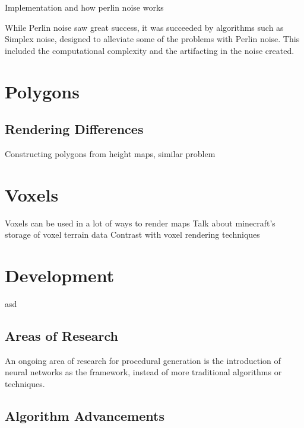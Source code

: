 \documentclass[10pt]{report}
\begin{document}
		Implementation and how perlin noise works
		
		While Perlin noise saw great success, it was succeeded by algorithms such as Simplex noise, designed to alleviate some of the problems with Perlin noise. This included the computational complexity and the artifacting in the noise created.
		
	
	\vspace{10pt}
	\let\clearpage\relax	
	\chapter{Polygons}
	
		\section{Rendering Differences}
		
		Constructing polygons from height maps, similar problem
	
	\vspace{10pt}
	\let\clearpage\relax
	\chapter{Voxels}
	
		Voxels can be used in a lot of ways to render maps 
		Talk about minecraft's storage of voxel terrain data
		Contrast with voxel rendering techniques
	
	\vspace{10pt}
	\let\clearpage\relax
	\chapter{Development}
		asd

		\section{Areas of Research}
	
		An ongoing area of research for procedural generation is the introduction of neural networks as the framework, instead of more traditional algorithms or techniques.\cite{Liu_2020}
		
		\section{Algorithm Advancements}
		
\end{document}
